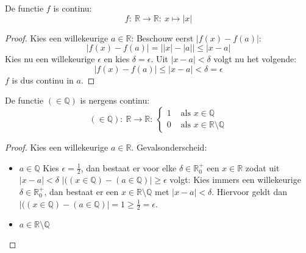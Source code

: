 \documentclass[main.tex]{subfiles}
\begin{document}

\begin{vb}
  De functie $f$ is continu:
  \[ f:\ \mathbb{R} \rightarrow \mathbb{R}:\ x \mapsto |x| \]

  \begin{proof}
    Kies een willekeurige $a\in \mathbb{R}$:
    Beschouw eerst $|f(x)-f(a)|$:
    \[ |f(x)-f(a)| = \left||x|-|a|\right| \le |x-a| \]
    Kies nu een willekeurige $\epsilon$ en kies $\delta = \epsilon$.
    Uit $|x-a| <\delta$ volgt nu het volgende:
    \[ |f(x)-f(a)| \le |x-a| < \delta = \epsilon \]
    $f$ is dus continu in $a$.
  \end{proof}
\end{vb}

\begin{vb}
  De functie $(\in \mathbb{Q})$ is nergens continu:
  \[
  (\in \mathbb{Q}):\ \mathbb{R} \rightarrow \mathbb{R}:\ 
  \left\{
    \begin{array}{rl}
      1 &\text{ als } x\in \mathbb{Q}\\
      0 &\text{ als } x\in \mathbb{R}\setminus \mathbb{Q}
    \end{array}
  \right.
  \]
  
  \begin{proof}
    Kies een willekeurige $a \in \mathbb{R}$.
    Gevalsonderscheid:
    \begin{itemize}
    \item $a\in \mathbb{Q}$
      Kies $\epsilon = \frac{1}{2}$, dan bestaat er voor elke $\delta \in \mathbb{R}_{0}^{+}$ een $x\in \mathbb{R}$ zodat uit $|x-a| < \delta$ $|((x \in \mathbb{Q})-(a\in \mathbb{Q})| \ge \epsilon$ volgt:
      Kies immers een willekeurige $\delta \in \mathbb{R}_{0}^{+}$, dan bestaat er een $x\in \mathbb{R}\setminus \mathbb{Q}$ met $|x-a| < \delta$. \needed
      Hiervoor geldt dan $|((x \in \mathbb{Q})-(a\in \mathbb{Q})| = 1 \ge \frac{1}{2} = \epsilon$.
    \item $a\in \mathbb{R}\setminus \mathbb{Q}$
    \end{itemize}
  \end{proof}
\end{vb}
\end{document}
